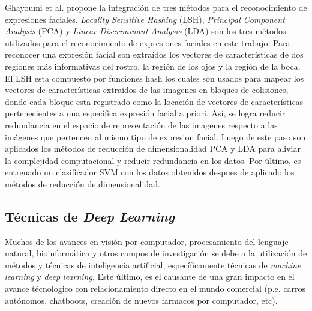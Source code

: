 \begin{enumerate}
{Ghayoumi et al.  propone la integración de tres métodos para el reconocimiento de expresiones faciales. \textit{Locality Sensitive Hashing} (LSH), \textit{Principal Component Analysis} (PCA) y \textit{Linear Discriminant Analysis} (LDA)  son los tres métodos utilizados para el reconocimiento de expresiones faciales en este trabajo. Para reconocer una expresión facial son extraídos los vectores de características de dos regiones más informativas del rostro, la región de los ojos y la región de la boca. El LSH esta compuesto por funciones hash los cuales son usados para mapear los vectores de características extraídos de las imagenes en bloques de colisiones, donde cada bloque esta registrado como la locación de vectores de características pertenecientes a una específica expresión facial a priori. Así, se logra reducir redundancia en el espacio de representación de las imagenes respecto a las imágenes que pertencen al mismo tipo de expresion facial. Luego de este paso son aplicados los métodos de reducción de dimensionalidad PCA y LDA  para aliviar la complejidad computacional y reducir redundancia en los datos. Por último, es entrenado un clasificador SVM con los datos obtenidos despues de aplicado los métodos de reducción de dimensionalidad.
}

\end{enumerate}

\subsection{Técnicas de \textit{Deep Learning}}

Muchos de los avances en visión por computador, procesamiento del lenguaje natural, bioinformática y otros campos de investigación se debe a la utilización de métodos y técnicas de inteligencia artificial, específicamente técnicas de \textit{machine learning} y \textit{deep learning}. Este último, es el causante de una gran impacto en el avance técnologico con relacionamiento directo en el mundo comercial (p.e. carros autónomos, chatboots, creación de nuevos farmacos por computador, etc). 

